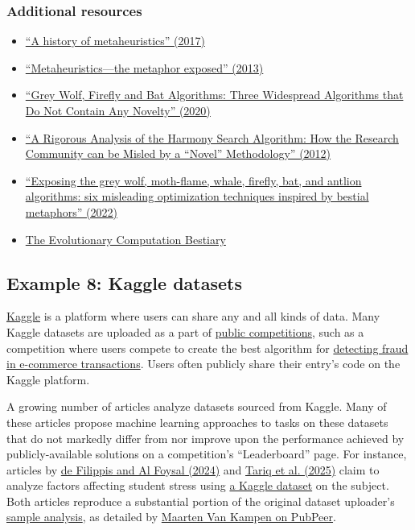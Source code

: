 \documentclass[letterpaper, 12pt]{article}
\begin{document}
\subsubsection*{Additional resources}

\begin{itemize}
    \setlength\itemsep{-0.5em}
    \item \href{https://doi.org/10.48550/arXiv.1704.00853}{``A history of metaheuristics'' (2017)}
    \item \href{https://doi.org/10.1111/itor.12001}{``Metaheuristics—the metaphor exposed'' (2013)}
    \item \href{https://doi.org/10.1007/978-3-030-60376-2_10}{``Grey Wolf, Firefly and Bat Algorithms: Three Widespread Algorithms that Do Not Contain Any Novelty'' (2020)}
    \item \href{https://doi.org/10.4018/978-1-4666-0270-0.ch005}{``A Rigorous Analysis of the Harmony Search Algorithm: How the Research Community can be Misled by a “Novel” Methodology'' (2012)}
    \item \href{https://doi.org/10.1111/itor.13176}{``Exposing the grey wolf, moth-flame, whale, firefly, bat, and antlion algorithms: six misleading optimization techniques inspired by bestial metaphors'' (2022)}
    \item \href{https://fcampelo.github.io/EC-Bestiary/}{The Evolutionary Computation Bestiary}
\end{itemize}

\subsection*{Example 8: Kaggle datasets}

\href{https://www.kaggle.com/datasets}{Kaggle} is a platform where users can share any and all kinds of data. Many Kaggle datasets are uploaded as a part of \href{https://www.kaggle.com/competitions}{public competitions}, such as a competition where users compete to create the best algorithm for \href{https://www.kaggle.com/competitions/ieee-fraud-detection/overview}{detecting fraud in e-commerce transactions}. Users often publicly share their entry's code on the Kaggle platform.

A growing number of articles analyze datasets sourced from Kaggle. Many of these articles propose machine learning approaches to tasks on these datasets that do not markedly differ from nor improve upon the performance achieved by publicly-available solutions on a competition's ``Leaderboard'' page. For instance, articles by \href{https://doi.org/10.1007/s44163-024-00169-6}{de Filippis and Al Foysal (2024)} and \href{https://doi.org/10.1038/s41598-025-22171-3}{Tariq et al. (2025)} claim to analyze factors affecting student stress using \href{https://www.kaggle.com/datasets/rxnach/student-stress-factors-a-comprehensive-analysis/data}{a Kaggle dataset} on the subject. Both articles reproduce a substantial portion of the original dataset uploader's \href{https://github.com/Chhabii/Students-Stress-Factors-Analysis}{sample analysis}, as detailed by \href{https://pubpeer.com/publications/2DDE0CBFB7C2138A5945A5292EF624#2}{Maarten Van Kampen on PubPeer}.
\end{document}
